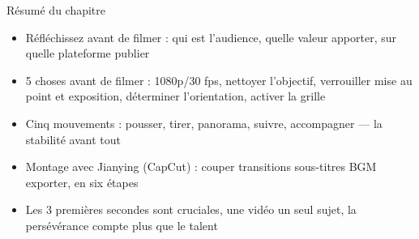 \begin{tcbsummary}{Résumé du chapitre}
\begin{itemize}
  \item Réfléchissez avant de filmer : qui est l'audience, quelle valeur apporter, sur quelle plateforme publier
  \item 5 choses avant de filmer : 1080p/30 fps, nettoyer l'objectif, verrouiller mise au point et exposition, déterminer l'orientation, activer la grille
  \item Cinq mouvements : pousser, tirer, panorama, suivre, accompagner — la stabilité avant tout
  \item Montage avec Jianying (CapCut) : couper transitions sous-titres BGM exporter, en six étapes
  \item Les 3 premières secondes sont cruciales, une vidéo un seul sujet, la persévérance compte plus que le talent
\end{itemize}

\end{tcbsummary}
